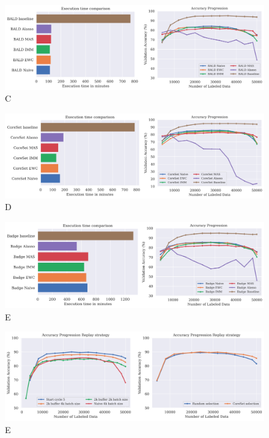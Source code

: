 \begin{figure} [ht]
    \centering
    \includegraphics[width=\linewidth]{images/results_CAL/Bald_CAL_4000b.png}
    \caption[Continual Active Learning BALD 4000 batch size]{C}
    \label{fig:Evaluation:Results:CAL:BALD4000}
\end{figure}

\begin{figure} [ht]
    \centering
    \includegraphics[width=\linewidth]{images/results_CAL/CoreSet_CAL_4000b.png}
    \caption[Continual Active Learning CoreSet 4000 batch size]{D}
    \label{fig:Evaluation:Results:CAL:CoreSet4000}
\end{figure}

\begin{figure} [ht]
    \centering
    \includegraphics[width=\linewidth]{images/results_CAL/Badge_CAL_4000b.png}
    \caption[Continual Active Learning Badge 4000 batch size]{E}
    \label{fig:Evaluation:Results:CAL:Badge4000}
\end{figure}


\begin{figure} [ht]
    \centering
    \includegraphics[width=\linewidth]{images/results_CAL/replay_CAL.png}
    \caption[Continual Active Learning Badge 4000 batch size]{E}
    \label{fig:Evaluation:Results:CAL:Replay}
\end{figure}

